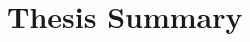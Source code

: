 \documentclass[letterpaper, 12pt, oneside]{memoir}
\begin{document}
\section*{Thesis Summary}




\end{document}
